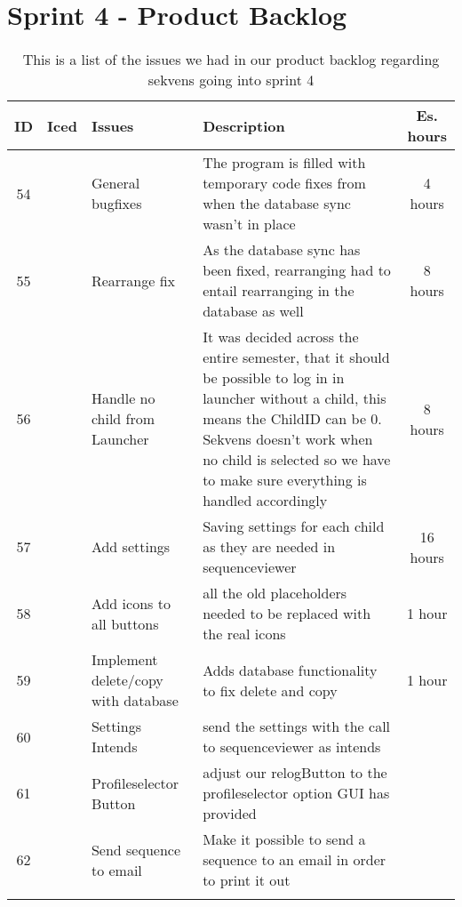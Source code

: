 \section{Sprint 4 - Product Backlog}
\begin{longtable} { | c | c | p{5cm} | p{5cm} | c | } 
\hline
	ID 	&	Iced	&	Issues	&	Description		&	 Es. hours \\\hline
	54	& 	 	&	General bugfixes		& 	The program is filled with temporary code fixes from when the database sync wasn't in place	 & 4 hours  \\\hline
	55	& 	 	&	Rearrange fix	& 	As the database sync has been fixed, rearranging had to entail rearranging in the database as well	 &   8 hours \\\hline
	56	& 	 	&	Handle no child from Launcher	& 	It was decided across the entire semester, that it should be possible to log in in launcher without a child, this means the ChildID can be 0. Sekvens doesn't work when no child is selected so we have to make sure everything is handled accordingly	 &  8 hours \\\hline
	57	& 	 	&	Add settings	& 	Saving settings for each child as they are needed in sequenceviewer	& 	16 hours  \\\hline
	58	& 	 	&	Add icons to all buttons	& 	all the old placeholders needed to be replaced with the real icons	 & 	1 hour  \\\hline
	59	& 	 	&	Implement delete/copy with database	& 	Adds database functionality to fix delete and copy	 & 1 hour  \\\hline
	60	& 	 	&	Settings Intends		& 	send the settings with the call to sequenceviewer as intends	 &   \\\hline
	61	& 	 	&	Profileselector Button	& 	adjust our relogButton to the profileselector option GUI has provided	 &   \\\hline
	62	& 	 	&	Send sequence to email	& 	Make it possible to send a sequence to an email in order to print it out &   \\\hline
\caption{This is a list of the issues we had in our product backlog regarding sekvens going into sprint 4}
\label{tab:spr4_prodblog}
\end{longtable}

